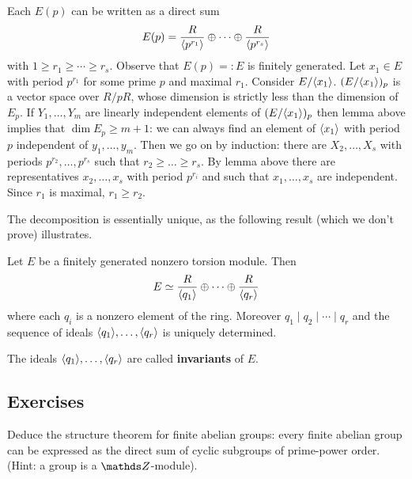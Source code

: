 Each $E(p)$ can be written as a direct sum $$E(p) = \frac{R}{\langle p^{r_1}\rangle} \oplus \cdots \oplus \frac{R}{\langle p^{r_s}\rangle} $$
with $1 \ge r_1 \ge \cdots \ge r_s$. 
Observe that $E(p)=:E$ is finitely generated. 
Let $x_1 \in E$ with period $p^{r_1}$ for some prime $p$ and maximal $r_1$. 
Consider $E/\langle x_1\rangle$. 
$(E/\langle x_1\rangle)_p$ is a vector space over $R/pR$, whose dimension is strictly less than the dimension of $E_p$. 
If $Y_1, \ldots, Y_m$ are linearly independent elements of $(E/\langle x_1\rangle)_p$ then lemma above implies that $\dim E_p \ge m+1$: we can always find an element of $\langle x_1\rangle$ with period $p$ independent of $y_1, \ldots, y_m$. 
Then we go on by induction: there are $X_2, \ldots, X_s$ with periods $p^{r_2}, \ldots, p^{r_s}$ such that $r_2 \ge \ldots \ge r_s$. 
By lemma above there are representatives $x_2, \ldots, x_s$ with period $p^{r_i}$ and such that $x_1, \ldots, x_s$ are independent. 
Since $r_1$ is maximal, $r_1 \ge r_2$. 


The decomposition is essentially unique, as the following result (which we don't prove) illustrates. 

\begin{thm} Let $E$ be a finitely generated nonzero torsion module. 
Then 
$$E\simeq \frac{R}{\langle q_1\rangle}\oplus \cdots \oplus \frac{R}{\langle q_r\rangle}$$
where each $q_i$ is a nonzero element of the ring. 
Moreover $q_1 \mid q_2 \mid \cdots \mid q_r$ and the sequence of ideals $\langle q_1\rangle, \ldots, \langle q_r\rangle$ is uniquely determined. 
\end{thm}

The ideals $\langle q_1\rangle, \ldots, \langle q_r\rangle$ are called \textbf{invariants} of $E$. 

\subsection*{Exercises}
\begin{ex}
Deduce the structure theorem for finite abelian groups:  every finite abelian group can be expressed as the direct sum of cyclic subgroups of prime-power order. 
(Hint: a group is a $\ZZ$-module).
\end{ex}
